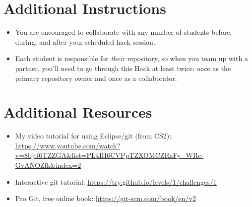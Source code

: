 \documentclass[12pt]{scrartcl}
\begin{document}
\section*{Additional Instructions}

\begin{itemize}
  \item You are encouraged to collaborate with any number of students 
  before, during, and after your scheduled hack session.    
  \item Each student is responsible for \emph{their} repository, so 
  when you team up with a partner, you'll need to go through this
  Hack at least twice: once as the primary repository owner and once as
  a collaborator.
\end{itemize}
  
\section*{Additional Resources}
\label{section:additionalResources}

\begin{itemize} 
  \item My video tutorial for using Eclipse/git (from CS2): \url{https://www.youtube.com/watch?v=8bjtf6TZZGA&list=PL4IH6CVPpTZXOMCZRaFy_WRc-GvANOZfk&index=2}
  \item Interactive git tutorial: \url{https://try.github.io/levels/1/challenges/1}
  \item Pro Git, free online book: \url{https://git-scm.com/book/en/v2}
\end{itemize}


  
\end{document}
